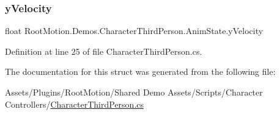 \subsubsection{\texorpdfstring{y\+Velocity}{yVelocity}}
{\footnotesize\ttfamily float Root\+Motion.\+Demos.\+Character\+Third\+Person.\+Anim\+State.\+y\+Velocity}



Definition at line 25 of file Character\+Third\+Person.\+cs.



The documentation for this struct was generated from the following file\+:\begin{DoxyCompactItemize}
\item 
Assets/\+Plugins/\+Root\+Motion/\+Shared Demo Assets/\+Scripts/\+Character Controllers/\mbox{\hyperlink{_character_third_person_8cs}{Character\+Third\+Person.\+cs}}\end{DoxyCompactItemize}
